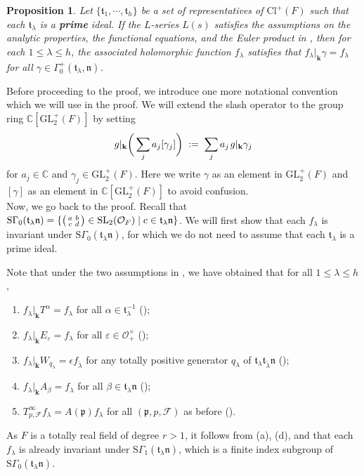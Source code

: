 \documentclass[11pt]{amsart}
\newtheorem{prop}[theorem]{Proposition}
\theoremstyle{remark}
\newcommand\sm[1]{\begin{psmallmatrix}#1\end{psmallmatrix}}
\newcommand\mbf[1]{\mathbf{#1}}
\newcommand\cl[1]{\mathcal{#1}}
\newcommand\fr[1]{\mathfrak{#1}}
\newcommand\wt[1]{\widetilde{#1}}
\newcommand{\comp}{\mathbb{C}}
\newcommand{\eps}{\varepsilon}
\newcommand{\clo}{\mathcal{O}}
\newcommand{\deq}{\;:=\;}
\def\thin{{\hskip 1pt}}
\newcommand{\GL}{\mathrm{GL}}
\newcommand{\SL}{\mathrm{SL}}
\newcommand{\Cl}{\mathrm{Cl}}
\newcommand{\SG}{\mathrm{S}\Gamma}
\begin{document}
\begin{prop}
\label{gamma0-inv}
Let $\{\fr{t}_1,\cdots,\fr{t}_h\}$ be a set of representatives of $\Cl^+(F)$ such that each $\fr{t}_\lambda$ is a \textbf{prime} ideal. If the $L$-series $L(s)$ satisfies the assumptions on the analytic properties, the functional equations, and the Euler product in , then for each \mbox{$1\leq\lambda\leq h$}, the associated holomorphic function $f_\lambda$ satisfies that $f_\lambda|_\mbf{k}\gamma=f_\lambda$ for all $\gamma\in\Gamma_0^+(\fr{t}_\lambda,\fr{n})$.
\end{prop}

Before proceeding to the proof, we introduce one more notational convention which we will use in the proof. We will extend the slash operator to the group ring $\comp[\GL_2^+(F)]$ by setting
\begin{align*}
    g|_\mbf{k}\bigg(\sum_j a_j[\gamma_j]\bigg)\deq\sum_j a_j\thin g|_\mbf{k}\gamma_j
\end{align*}
for $a_j\in\comp$ and $\gamma_j\in\GL_2^+(F)$. Here we write $\gamma$ as an element in $\GL_2^+(F)$ and $[\gamma]$ as an element in $\comp[\GL_2^+(F)]$ to avoid confusion.
\\

Now, we go back to the proof. Recall that $\SG_0(\fr{t}_\lambda\fr{n})=\{\sm{a&b\\c&d}\in\SL_2(\clo_F)\mid c\in\fr{t}_\lambda\fr{n}\}$. We will first show that each $f_\lambda$ is invariant under $\SG_0(\fr{t}_\lambda\fr{n})$, for which we do not need to assume that each $\fr{t}_\lambda$ is a prime ideal.

Note that under the two assumptions in , we have obtained that for all $1\leq\lambda\leq h$,
\begin{enumerate}[label=\rm{(\alph*)}]
    \item $f_\lambda|_\mbf{k}T^\alpha=f_\lambda$ for all $\alpha\in\fr{t}_\lambda^{-1}$ ();
    \item $f_\lambda|_\mbf{k}E_\eps=f_\lambda$ for all $\eps\in\clo_+^\times$ ();
    \item $f_\lambda|_\mbf{k}W_{q_\lambda}=\epsilon f_{\wt{\lambda}}$ for any totally positive generator $q_\lambda$ of $\fr{t}_\lambda\fr{t}_{\wt{\lambda}}\fr{n}$ ();
    \item $f_\lambda|_\mbf{k}A_\beta=f_\lambda$ for all $\beta\in\fr{t}_\lambda\fr{n}$ ();
    \item $T_{p,\cl{F}}^\infty f_\lambda=A(\fr{p})f_\lambda$ for all $(\fr{p},p,\cl{F})$ as before ().
\end{enumerate}
As $F$ is a totally real field of degree $r>1$, it follows from (a), (d), and  that each $f_\lambda$ is already invariant under $\SG_1(\fr{t}_\lambda\fr{n})$, which is a finite index subgroup of $\SG_0(\fr{t}_\lambda\fr{n})$.
\end{document}
